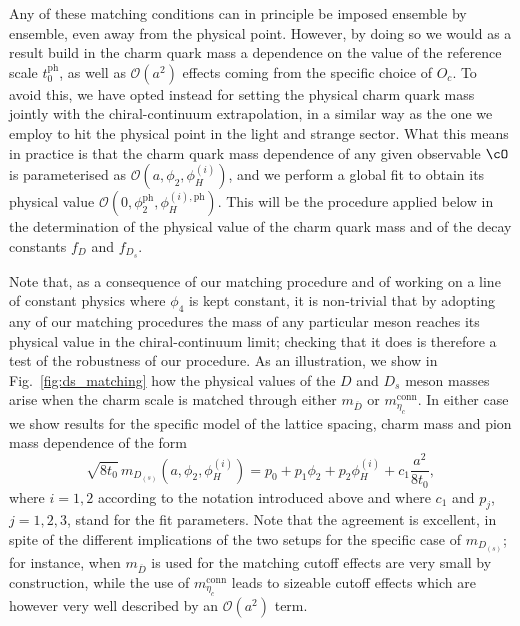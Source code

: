 %
Any of these matching conditions can in principle be imposed ensemble by ensemble, even away from the physical point.
%
However, by doing so we would as a result build in the charm quark mass a dependence on the value of the reference scale $t_0^{\mathrm{ph}}$, as well as $\mathcal{O}(a^2)$ effects coming from the specific choice of $O_c$.
%
To avoid this, we have opted instead for setting the physical charm quark mass jointly with the chiral-continuum extrapolation, in a similar way as the one we employ to hit the physical point in the light and strange sector.
%
What this means in practice is that the charm quark mass dependence of any given observable $\cO$ is parameterised as $\mathcal{O}(a, \phi_2, \phi_H^{(i)})$, and we perform a global fit to obtain its physical value $\mathcal{O}(0, \phi_2^{\mathrm{ph}}, \phi_H^{(i),\mathrm{ph}})$.
%
This will be the procedure applied below in the determination of the physical value of the charm quark mass and of the decay constants $f_D$ and $f_{D_s}$.
%

%
Note that, as a consequence of our matching procedure and of working on a line of constant physics where $\phi_4$ is kept constant, it is non-trivial that by adopting any of our matching procedures the mass of any particular meson reaches its physical value in the chiral-continuum limit; checking that it does is therefore a test of the robustness of our procedure.
%
As an illustration, we show in Fig.~\ref{fig:ds_matching} how the physical values of the $D$ and $D_s$ meson masses arise when the charm scale is matched through either $m_{\overline D}$ or $m_{\eta_c}^{\mathrm{conn}}$.
%
In either case we show results for the specific model of the lattice spacing, charm mass and pion mass dependence of the form
\begin{equation}
\sqrt{8t_0}\, m_{D_{(s)}}(a, \phi_2, \phi_H^{(i)}) = p_0 + p_1\phi_2 +  p_2 \phi_H^{(i)} + c_1\frac{a^2}{8t_0},
\end{equation}
where $i=1,2$ according to the notation introduced above and where $c_1$ and $p_j$, $j=1,2,3$, stand for the fit parameters.
%
Note that the agreement is excellent, in spite of the different implications of the two setups for the specific case of $m_{D_{(s)}}$; for instance, when $m_{\overline D}$ is used for the matching cutoff effects are very small by construction, while the use of $m_{\eta_c}^{\mathrm{conn}}$ leads to sizeable cutoff effects which are however very well described by an $\mathcal{O}(a^2)$ term.


